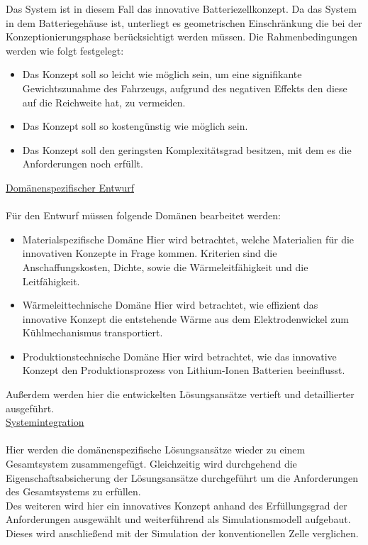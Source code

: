 Das System ist in diesem Fall das innovative Batteriezellkonzept. Da das System in dem Batteriegehäuse ist, unterliegt es geometrischen Einschränkung die bei der Konzeptionierungsphase berücksichtigt werden müssen. Die Rahmenbedingungen werden wie folgt festgelegt: \\

\begin{itemize}
	\item Das Konzept soll so leicht wie möglich sein, um eine signifikante Gewichtszunahme des Fahrzeugs, aufgrund des negativen Effekts den diese auf die Reichweite hat, zu vermeiden.
	\item Das Konzept soll so kostengünstig wie möglich sein.
	\item Das Konzept soll den geringsten Komplexitätsgrad besitzen, mit dem es die Anforderungen noch erfüllt.
\end{itemize}

\underline{Domänenspezifischer Entwurf}\\
\\

Für den Entwurf müssen folgende Domänen bearbeitet werden: 

\begin{itemize}
	\item Materialspezifische Domäne
	\subitem Hier wird betrachtet, welche Materialien für die innovativen Konzepte in Frage kommen. Kriterien sind die Anschaffungskosten, Dichte, sowie die Wärmeleitfähigkeit und die Leitfähigkeit.
	\item Wärmeleittechnische Domäne
	\subitem Hier wird betrachtet, wie effizient das innovative Konzept die entstehende Wärme aus dem Elektrodenwickel zum Kühlmechanismus transportiert.
	\item Produktionstechnische Domäne
	\subitem Hier wird betrachtet, wie das innovative Konzept den Produktionsprozess von Lithium-Ionen Batterien beeinflusst.
\end{itemize}

Außerdem werden hier die entwickelten Lösungsansätze vertieft und detaillierter ausgeführt.\\

\underline{Systemintegration}\\
\\

Hier werden die domänenspezifische Lösungsansätze wieder zu einem Gesamtsystem zusammengefügt. Gleichzeitig wird durchgehend die Eigenschaftsabsicherung der Lösungsansätze durchgeführt um die Anforderungen des Gesamtsystems zu erfüllen.\\
Des weiteren wird hier ein innovatives Konzept anhand des Erfüllungsgrad der Anforderungen ausgewählt und weiterführend als Simulationsmodell aufgebaut. Dieses wird anschließend mit der Simulation der konventionellen Zelle verglichen.\\

